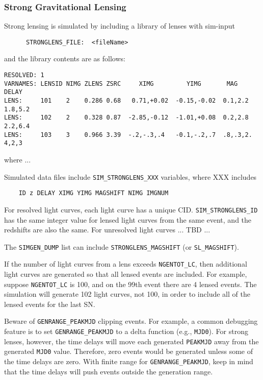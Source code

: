 \documentclass[12pt]{article}
\begin{document}
{%
\subsubsection{Strong Gravitational Lensing}
\label{sss:stronglens}

Strong lensing is simulated by including a library of lenses with
sim-input 
%
\begin{verbatim}
      STRONGLENS_FILE:  <fileName>
\end{verbatim}
%
and the library contents are as follows:
%
\begin{verbatim}
RESOLVED: 1  
VARNAMES: LENSID NIMG ZLENS ZSRC     XIMG         YIMG       MAG      DELAY
LENS:     101    2    0.286 0.68   0.71,+0.02  -0.15,-0.02  0.1,2.2  1.8,5.2
LENS:     102    2    0.328 0.87  -2.85,-0.12  -1.01,+0.08  0.2,2.8  2.2,6.4
LENS:     103    3    0.966 3.39  -.2,-.3,.4   -0.1,-.2,.7  .8,.3,2.  4,2,3
\end{verbatim}
%
where ...

Simulated data files include {\tt SIM\_STRONGLENS\_XXX} variables, 
where XXX includes
\begin{verbatim}
    ID z DELAY XIMG YIMG MAGSHIFT NIMG IMGNUM
\end{verbatim}
%
For resolved light curves, each light curve has a unique CID.
{\tt SIM\_STRONGLENS\_ID} has the same integer value for
lensed light curves from the same event, and the redshifts
are also the same.
For unresolved light curves ... TBD ...

The {\tt SIMGEN\_DUMP} list can include {\tt STRONGLENS\_MAGSHIFT}
(or {\tt SL\_MAGSHIFT}).

If the number of light curves from a lens exceeds {\tt NGENTOT\_LC},
then additional light curves are generated so that all lensed
events are included. For example, suppose {\tt NGENTOT\_LC} is 100,
and on the 99th event there are 4 lensed events. The simulation
will generate 102 light curves, not 100, in order to include
all of the lensed events for the last SN.

Beware of {\tt GENRANGE\_PEAKMJD} clipping events. For example,
a common debugging feature is to set {\tt GENRANGE\_PEAKMJD} to 
a delta function (e.g., {\tt MJD0}). 
For strong lenses, however, the time delays will move each generated 
{\tt PEAKMJD} away from the generated {\tt MJD0} value.
Therefore, zero events would be generated unless some of the 
time delays are zero. With finite range for {\tt GENRANGE\_PEAKMJD},
keep in mind that the time delays will push events outside the
generation range.


}
\end{document}
